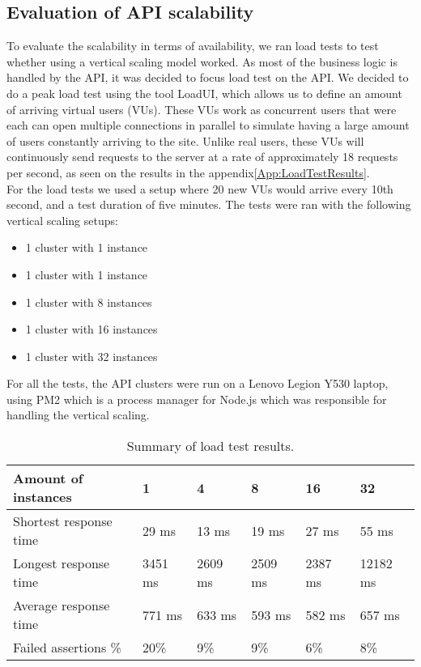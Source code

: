 \subsection{Evaluation of API scalability}
To evaluate the scalability in terms of availability, we ran load tests to test whether using a vertical scaling model worked.
As most of the business logic is handled by the API, it was decided to focus load test on the API.
We decided to do a peak load test using the tool LoadUI, which allows us to define an amount of arriving virtual users (VUs)\cite{loadimpactSource}. 
These VUs work as concurrent users that were each can open multiple connections in parallel to simulate having a large amount of users constantly arriving to the site.
Unlike real users, these VUs will continuously send requests to the server at a rate of approximately 18 requests per second, as seen on the results in the appendix\autoref{App:LoadTestResults}.
\\
For the load tests we used a setup where 20 new VUs would arrive every 10th second, and a test duration of five minutes.
The tests were ran with the following vertical scaling setups:
\begin{itemize}
    \item 1 cluster with 1 instance
    \item 1 cluster with 1 instance
    \item 1 cluster with 8 instances
    \item 1 cluster with 16 instances
    \item 1 cluster with 32 instances
\end{itemize}
For all the tests, the API clusters were run on a Lenovo Legion Y530 laptop, using PM2 which is a process manager for Node.js which was responsible for handling the vertical scaling\cite{PM2}.

\begin{table}[]
    \begin{tabular}{|l|l|l|l|l|l|}
    \hline
    \textbf{Amount of instances} & \textbf{1} & \textbf{4} & \textbf{8} & \textbf{16} & \textbf{32} \\ \hline
    Shortest response time       & 29 ms      & 13 ms      & 19 ms      & 27 ms       & 55 ms       \\ \hline
    Longest response time        & 3451 ms    & 2609 ms    & 2509 ms    & 2387 ms     & 12182 ms    \\ \hline
    Average response time        & 771 ms     & 633 ms     & 593 ms     & 582 ms      & 657 ms      \\ \hline
    Failed assertions \%         & 20\%       & 9\%        & 9\%        & 6\%         & 8\%         \\ \hline
    \end{tabular}
    \caption{Summary of load test results.}
    \label{table:load-test-table}
\end{table}

